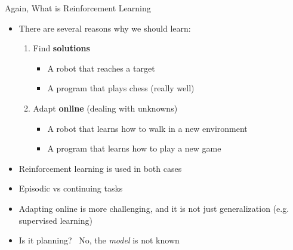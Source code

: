 \documentclass[presentation, 9pt]{beamer}\mode<presentation>{\usetheme{AMSBolognaFC}}
\begin{document}
\begin{frame}{Again, What is Reinforcement Learning}
\begin{itemize}
	\item There are several reasons why we should learn:
	\begin{enumerate}
		\item Find \textbf{solutions}
		\begin{itemize}
			\item A robot that reaches a target
			\item A program that plays chess (really well)
		\end{itemize}
		\item Adapt \textbf{online} (dealing with unknowns)
		\begin{itemize}
			\item A robot that learns how to walk in a new environment
			\item A program that learns how to play a new game
		\end{itemize}
	\end{enumerate}
	\item Reinforcement learning is used in both cases
	\item Episodic vs continuing tasks 

	\item Adapting online is more challenging, and it is not just generalization (e.g. supervised learning)
	\item Is it planning? \faArrowRight \, No, the \emph{model} is not known
\end{itemize}

\end{frame}
\end{document}
